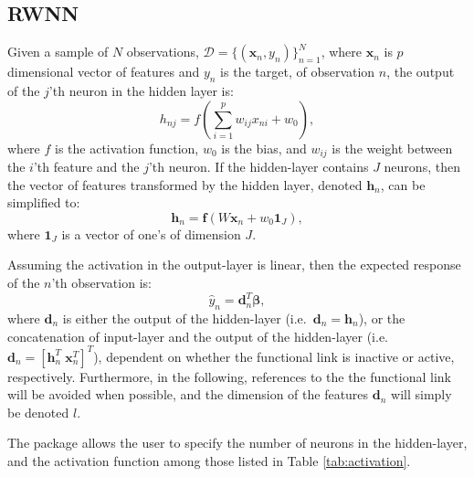 \documentclass[
]{jss}
\begin{document}
\hypertarget{rwnn}{%
\subsection{RWNN}\label{rwnn}}

Given a sample of \(N\) observations,
\(\mathcal D = \{(\boldsymbol x_n, y_n)\}_{n = 1}^N\), where
\(\boldsymbol x_n\) is \(p\) dimensional vector of features and \(y_n\)
is the target, of observation \(n\), the output of the \(j\)'th neuron
in the hidden layer is: \begin{equation}
    h_{nj} = f\left(\sum_{i = 1}^p w_{ij} x_{ni} + w_{0}\right), \label{eq:hidden}
\end{equation} where \(f\) is the activation function, \(w_0\) is the
bias, and \(w_{ij}\) is the weight between the \(i\)'th feature and the
\(j\)'th neuron. If the hidden-layer contains \(J\) neurons, then the
vector of features transformed by the hidden layer, denoted
\(\boldsymbol h_{n}\), can be simplified to: \begin{equation} 
    \boldsymbol h_n = \boldsymbol f\left(W \boldsymbol{x}_n + w_0 \boldsymbol{1}_{J}\right), 
\end{equation} where \(\boldsymbol{1}_{J}\) is a vector of one's of
dimension \(J\).

Assuming the activation in the output-layer is linear, then the expected
response of the \(n\)'th observation is: \begin{equation}
    \hat{y}_n = \boldsymbol d^T_n \boldsymbol \beta,
\end{equation} where \(\boldsymbol d_n\) is either the output of the
hidden-layer (i.e.~\(\boldsymbol d_n = \boldsymbol h_n\)), or the
concatenation of input-layer and the output of the hidden-layer
(i.e.~\(\boldsymbol d_n = [\boldsymbol h_n^T \; \boldsymbol x_n^T]^T\)),
dependent on whether the functional link is inactive or active,
respectively. Furthermore, in the following, references to the the
functional link will be avoided when possible, and the dimension of the
features \(\boldsymbol d_n\) will simply be denoted \(l\).

The  package allows the user to specify the number of neurons
in the hidden-layer, and the activation function among those listed in
Table \ref{tab:activation}.
\end{document}
